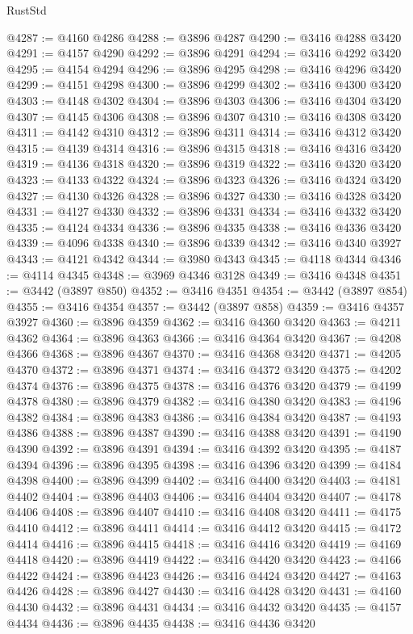 \begin{lexlean}{RustStd}
\begin{coremodule}
@4287 := @4160 @4286
@4288 := @3896 @4287
@4290 := @3416 @4288 @3420
@4291 := @4157 @4290
@4292 := @3896 @4291
@4294 := @3416 @4292 @3420
@4295 := @4154 @4294
@4296 := @3896 @4295
@4298 := @3416 @4296 @3420
@4299 := @4151 @4298
@4300 := @3896 @4299
@4302 := @3416 @4300 @3420
@4303 := @4148 @4302
@4304 := @3896 @4303
@4306 := @3416 @4304 @3420
@4307 := @4145 @4306
@4308 := @3896 @4307
@4310 := @3416 @4308 @3420
@4311 := @4142 @4310
@4312 := @3896 @4311
@4314 := @3416 @4312 @3420
@4315 := @4139 @4314
@4316 := @3896 @4315
@4318 := @3416 @4316 @3420
@4319 := @4136 @4318
@4320 := @3896 @4319
@4322 := @3416 @4320 @3420
@4323 := @4133 @4322
@4324 := @3896 @4323
@4326 := @3416 @4324 @3420
@4327 := @4130 @4326
@4328 := @3896 @4327
@4330 := @3416 @4328 @3420
@4331 := @4127 @4330
@4332 := @3896 @4331
@4334 := @3416 @4332 @3420
@4335 := @4124 @4334
@4336 := @3896 @4335
@4338 := @3416 @4336 @3420
@4339 := @4096 @4338
@4340 := @3896 @4339
@4342 := @3416 @4340 @3927
@4343 := @4121 @4342
@4344 := @3980 @4343
@4345 := @4118 @4344
@4346 := @4114 @4345
@4348 := @3969 @4346 @3128
@4349 := @3416 @4348
@4351 := @3442 (@3897 @850)
@4352 := @3416 @4351
@4354 := @3442 (@3897 @854)
@4355 := @3416 @4354
@4357 := @3442 (@3897 @858)
@4359 := @3416 @4357 @3927
@4360 := @3896 @4359
@4362 := @3416 @4360 @3420
@4363 := @4211 @4362
@4364 := @3896 @4363
@4366 := @3416 @4364 @3420
@4367 := @4208 @4366
@4368 := @3896 @4367
@4370 := @3416 @4368 @3420
@4371 := @4205 @4370
@4372 := @3896 @4371
@4374 := @3416 @4372 @3420
@4375 := @4202 @4374
@4376 := @3896 @4375
@4378 := @3416 @4376 @3420
@4379 := @4199 @4378
@4380 := @3896 @4379
@4382 := @3416 @4380 @3420
@4383 := @4196 @4382
@4384 := @3896 @4383
@4386 := @3416 @4384 @3420
@4387 := @4193 @4386
@4388 := @3896 @4387
@4390 := @3416 @4388 @3420
@4391 := @4190 @4390
@4392 := @3896 @4391
@4394 := @3416 @4392 @3420
@4395 := @4187 @4394
@4396 := @3896 @4395
@4398 := @3416 @4396 @3420
@4399 := @4184 @4398
@4400 := @3896 @4399
@4402 := @3416 @4400 @3420
@4403 := @4181 @4402
@4404 := @3896 @4403
@4406 := @3416 @4404 @3420
@4407 := @4178 @4406
@4408 := @3896 @4407
@4410 := @3416 @4408 @3420
@4411 := @4175 @4410
@4412 := @3896 @4411
@4414 := @3416 @4412 @3420
@4415 := @4172 @4414
@4416 := @3896 @4415
@4418 := @3416 @4416 @3420
@4419 := @4169 @4418
@4420 := @3896 @4419
@4422 := @3416 @4420 @3420
@4423 := @4166 @4422
@4424 := @3896 @4423
@4426 := @3416 @4424 @3420
@4427 := @4163 @4426
@4428 := @3896 @4427
@4430 := @3416 @4428 @3420
@4431 := @4160 @4430
@4432 := @3896 @4431
@4434 := @3416 @4432 @3420
@4435 := @4157 @4434
@4436 := @3896 @4435
@4438 := @3416 @4436 @3420

\end{coremodule}
\end{lexlean}
